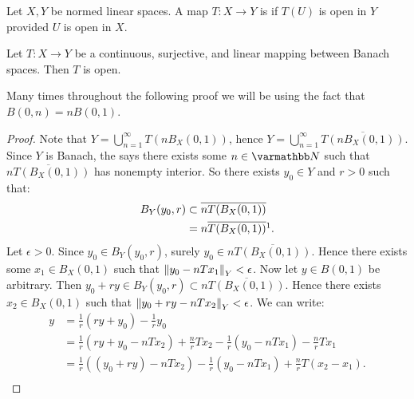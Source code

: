\begin{definition}
    Let $X,Y$ be normed linear spaces. A map $T:X \rightarrow Y$ is  if $T(U)$ is open in $Y$ provided $U$ is open in $X$.
\end{definition}

\begin{theorem}\label{thm:open-mapping-thm}
    Let $T:X \rightarrow Y$ be a continuous, surjective, and linear mapping between Banach spaces. Then $T$ is open.
\end{theorem}
    \begin{remark}
        Many times throughout the following proof we will be using the fact that $B(0,n) =  n B(0,1)$.
    \end{remark}
    \begin{proof}
        Note that $Y = \bigcup_{n = 1}^\infty T(n B_X(0,1))$, hence $Y = \bigcup_{n = 1}^\infty \overline{T(nB_X(0,1))}$. Since $Y$ is Banach, the  says  there exists some $n \in \bfN$ such that $\overline{n T(B_X(0,1))}$ has nonempty interior. So there exists $y_0 \in Y$ and $r > 0$ such that:
            \begin{equation*}
            \begin{split}
                B_Y(y_0,r) 
                & \subset \overline{n T(B_X(0,1))} \\
                & = n \overline{T(B_X(0,1))}\footnotemark.
            \end{split}
            \end{equation*}
             Let $\epsilon > 0$. Since $y_0 \in B_Y(y_0,r)$, surely $y_0 \in n\overline{T(B_X(0,1))}$. Hence there exists some $x_1 \in B_X(0,1)$ such that $\left\lVert y_0 - nT x_1 \right\rVert_Y < \epsilon$. Now let $y \in B(0,1)$ be arbitrary. Then $y_0 + ry \in B_Y(y_0,r) \subset n\overline{T(B_X(0,1))}$. Hence there exists $x_2 \in B_X(0,1)$ such that $\left\lVert y_0 + ry - n T x_2 \right\rVert_Y < \epsilon$. We can write:
                \begin{equation*}
                \begin{split}
                    y 
                    & = \frac{1}{r}(ry + y_0) - \frac{1}{r}y_0 \\
                    & = \frac{1}{r}(ry + y_0 - n T x_2) + \frac{n}{r}T x_2 - \frac{1}{r}(y_0 - n T x_1) - \frac{n}{r}T x_1 \\
                    & = \frac{1}{r} \left( (y_0 + ry) - n T x_2 \right) - \frac{1}{r}(y_0 - n Tx_1) + \frac{n}{r}T(x_2 - x_1). \\

\end{split}
\end{equation*}
\end{proof}
